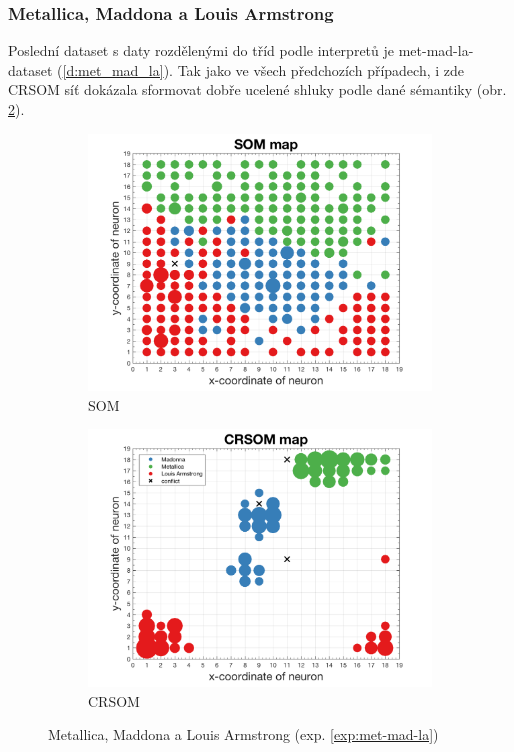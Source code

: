 \documentclass[thesis=M,czech]{FITthesis}[2012/06/26]
\begin{document}
\subsubsection*{Metallica, Maddona a Louis Armstrong}
Poslední dataset s daty rozdělenými do tříd podle interpretů je met-mad-la-dataset (\ref{d:met_mad_la}). Tak jako ve všech předchozích případech, i zde CRSOM síť dokázala sformovat dobře ucelené shluky podle dané sémantiky (obr. \ref{fig:metmadlacrsom}).

\begin{figure}
\centering
\begin{subfigure}{.5\textwidth}
  \centering
  \includegraphics[width=.99\linewidth]{exp_met_mad_la_som.png}
  \caption{SOM}
  \label{fig:sub1}
\end{subfigure}%
\begin{subfigure}{.5\textwidth}
  \centering
  \includegraphics[width=.99\linewidth]{exp_met_mad_la_crsom.png}
  \caption{CRSOM}
  \label{fig:metmadlacrsom}
\end{subfigure}
\caption{Metallica, Maddona a Louis Armstrong (exp. \ref{exp:met-mad-la})}
\label{fig:top}
\end{figure}
\end{document}
